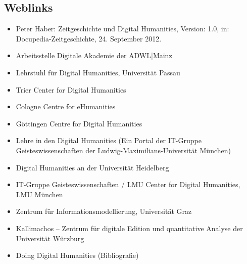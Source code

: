 \documentclass{article}
\begin{document}
\subsection{Weblinks}
\begin{itemize}
\item Peter Haber: Zeitgeschichte und Digital Humanities, Version: 1.0, in: Docupedia-Zeitgeschichte, 24. September 2012.
\item Arbeitsstelle Digitale Akademie der ADWL|Mainz
\item Lehrstuhl für Digital Humanities, Universität Passau
\item Trier Center for Digital Humanities
\item Cologne Centre for eHumanities
\item Göttingen Centre for Digital Humanities
\item Lehre in den Digital Humanities (Ein Portal der IT-Gruppe Geisteswissenschaften der Ludwig-Maximilians-Universität München)
\item Digital Humanities an der Universität Heidelberg
\item IT-Gruppe Geisteswissenschaften / LMU Center for Digital Humanities, LMU München
\item Zentrum für Informationsmodellierung, Universität Graz
\item Kallimachos – Zentrum für digitale Edition und quantitative Analyse der Universität Würzburg
\item Doing Digital Humanities (Bibliografie)
\end{itemize}
\end{document}
